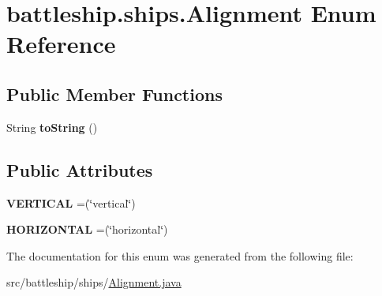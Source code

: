 \hypertarget{enumbattleship_1_1ships_1_1Alignment}{}\section{battleship.\+ships.\+Alignment Enum Reference}
\label{enumbattleship_1_1ships_1_1Alignment}
\subsection*{Public Member Functions}
\begin{DoxyCompactItemize}
\item 
\hypertarget{enumbattleship_1_1ships_1_1Alignment_ae59f166b0e2f0297522888051a76df5f}{}String {\bfseries to\+String} ()\label{enumbattleship_1_1ships_1_1Alignment_ae59f166b0e2f0297522888051a76df5f}

\end{DoxyCompactItemize}
\subsection*{Public Attributes}
\begin{DoxyCompactItemize}
\item 
\hypertarget{enumbattleship_1_1ships_1_1Alignment_a56e3c5a4c6f215d5793ca689c85d6302}{}{\bfseries V\+E\+R\+T\+I\+C\+A\+L} =(\char`\"{}vertical\char`\"{})\label{enumbattleship_1_1ships_1_1Alignment_a56e3c5a4c6f215d5793ca689c85d6302}

\item 
\hypertarget{enumbattleship_1_1ships_1_1Alignment_acf08621ef5edca96672d1ae5f9b059de}{}{\bfseries H\+O\+R\+I\+Z\+O\+N\+T\+A\+L} =(\char`\"{}horizontal\char`\"{})\label{enumbattleship_1_1ships_1_1Alignment_acf08621ef5edca96672d1ae5f9b059de}

\end{DoxyCompactItemize}


The documentation for this enum was generated from the following file\+:\begin{DoxyCompactItemize}
\item 
src/battleship/ships/\hyperlink{Alignment_8java}{Alignment.\+java}\end{DoxyCompactItemize}
